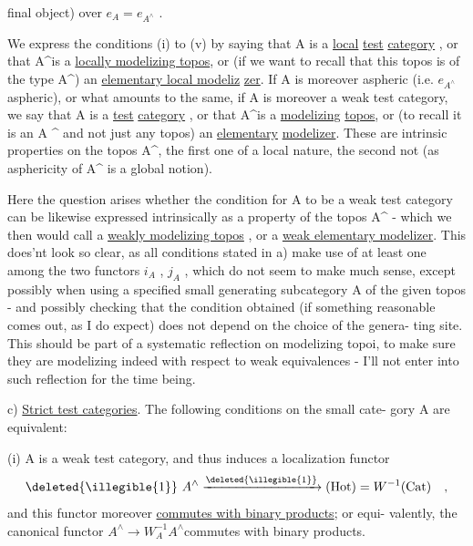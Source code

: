 
final object)  over $e_A = e_{A^\wedge}$ .

We express the conditions (i) to (v)  by saying that A is a \uline{local}
\uline{test} \uline{category} ,  or that A\^{}\hand{/}is a \uline{locally modelizing topos},  or (if we want
to recall that this topos is of the  type A\^{}) an \uline{elementary local modeliz}
\uline{zer}.  If A is moreover aspheric  (i.e. $e_{A^\wedge}$ aspheric),  or what amounts to
the same,  if A is moreover a weak test category,  we say that A is a
\uline{test} \uline{category} ,  or that A\^{}is a \uline{modelizing} \uline{topos}, or (to recall it is an
A \^{} and not just any topos) an \uline{elementary} \uline{modelizer}.  These are intrinsic
properties on the topos A\^{},  the first one of a local nature,  the second
not (as asphericity of A\^{} is a global notion).

Here the question arises whether the condition for A to be a weak 
test category can be likewise expressed intrinsically as a property of the
topos A\^{} -  which we then would call a \uline{weakly modelizing topos} ,  or a
\uline{weak elementary modelizer}.  This does'nt look so clear,  as all conditions
stated in a)  make use of at least one among the two functors $i_A$ , $j_A$ ,
which do not seem to make much sense, except  possibly when using a
specified small generating subcategory A of the given topos   -  and
possibly checking that the condition obtained (if something reasonable
comes out,  as I do expect) does not depend on the choice of the genera-%
ting site.  This should be part of a systematic reflection on modelizing
topoi,   to make sure they are  modelizing indeed with respect to
weak equivalences  -   I'll not  enter into such reflection
for the time being.

c)   \uline{Strict test categories}.   The following conditions on the small cate-%
gory A are equivalent:

(i)   A is a weak test category,  and thus induces a localization
functor
\[ \deleted{\illegible{1}}\ A^\wedge \xrightarrow{\deleted{\illegible{1}}} (\mathrm{Hot}) = W^{-1}(\mathrm{Cat}) \quad , \]
and this functor moreover \uline{commutes with binary products};  or equi-%
valently,  the canonical functor $A^\wedge \to W_A^{-1}A^\wedge$\hand{/}commutes with binary
products.

